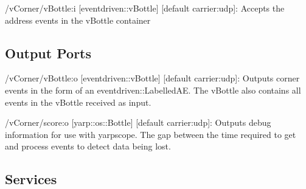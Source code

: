 \begin{DoxyItemize}
\item /v\+Corner/v\+Bottle\+:i \mbox{[}eventdriven\+::v\+Bottle\mbox{]} \mbox{[}default carrier\+:udp\mbox{]}\+: Accepts the address events in the v\+Bottle container
\end{DoxyItemize}\hypertarget{group__zynqGrabber_outputports_sec}{}\subsection{Output Ports}\label{group__zynqGrabber_outputports_sec}

\begin{DoxyItemize}
\item /v\+Corner/v\+Bottle\+:o \mbox{[}eventdriven\+::v\+Bottle\mbox{]} \mbox{[}default carrier\+:udp\mbox{]}\+: Outputs corner events in the form of an eventdriven\+::\+Labelled\+AE. The v\+Bottle also contains all events in the v\+Bottle received as input.
\item /v\+Corner/score\+:o \mbox{[}yarp\+::os\+::\+Bottle\mbox{]} \mbox{[}default carrier\+:udp\mbox{]}\+: Outputs debug information for use with yarpscope. The gap between the time required to get and process events to detect data being lost.
\end{DoxyItemize}\hypertarget{group__zynqGrabber_services_sec}{}\subsection{Services}\label{group__zynqGrabber_services_sec}
